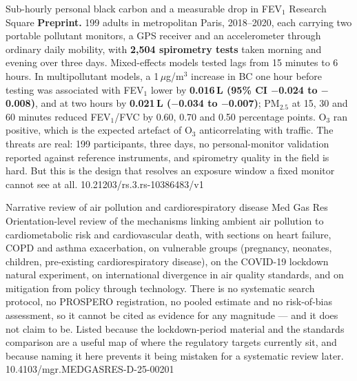\documentclass[10pt]{article}
\begin{document}
{Sub-hourly personal black carbon and a measurable drop in FEV$_1$}
{Research Square}
{\textbf{Preprint.} 199 adults in metropolitan Paris, 2018--2020, each carrying two
portable pollutant monitors, a GPS receiver and an accelerometer through ordinary daily
mobility, with \textbf{2{,}504 spirometry tests} taken morning and evening over three days.
Mixed-effects models tested lags from 15 minutes to 6 hours. In multipollutant models, a
1\,$\mu$g/m$^3$ increase in BC one hour before testing was associated with FEV$_1$ lower by
\textbf{0.016\,L (95\% CI $-$0.024 to $-$0.008)}, and at two hours by
\textbf{0.021\,L ($-$0.034 to $-$0.007)}; PM$_{2.5}$ at 15, 30 and 60 minutes reduced
FEV$_1$/FVC by 0.60, 0.70 and 0.50 percentage points. O$_3$ ran positive, which is the
expected artefact of O$_3$ anticorrelating with traffic. The threats are real: 199
participants, three days, no personal-monitor validation reported against reference
instruments, and spirometry quality in the field is hard. But this is the design that
resolves an exposure window a fixed monitor cannot see at all.}
{10.21203/rs.3.rs-10386483/v1}

{Narrative review of air pollution and cardiorespiratory disease}
{Med Gas Res}
{Orientation-level review of the mechanisms linking ambient air pollution to
cardiometabolic risk and cardiovascular death, with sections on heart failure, COPD and
asthma exacerbation, on vulnerable groups (pregnancy, neonates, children, pre-existing
cardiorespiratory disease), on the COVID-19 lockdown natural experiment, on international
divergence in air quality standards, and on mitigation from policy through technology.
There is no systematic search protocol, no PROSPERO registration, no pooled estimate and
no risk-of-bias assessment, so it cannot be cited as evidence for any magnitude --- and it
does not claim to be. Listed because the lockdown-period material and the standards
comparison are a useful map of where the regulatory targets currently sit, and because
naming it here prevents it being mistaken for a systematic review later.}
{10.4103/mgr.MEDGASRES-D-25-00201}

\clearpage

\end{document}
